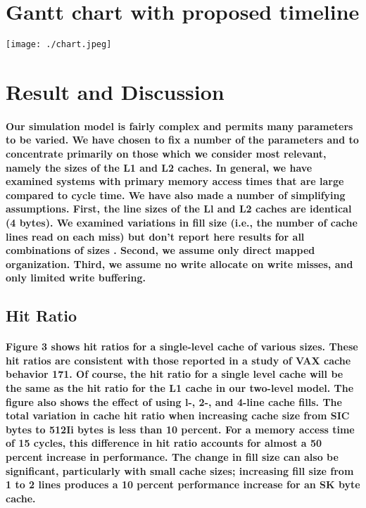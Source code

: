 \documentclass{article}
\begin{document}
\section{Gantt chart with proposed timeline}
\texttt{[image: ./chart.jpeg]}

\section{Result and Discussion}

\paragraph{Our simulation model is fairly complex and permits many 
parameters to be varied. We have chosen to fix a number of the parameters 
and to concentrate primarily on those which we consider most relevant, namely 
the sizes of the L1 and L2 caches. In general, we have examined systems with 
primary memory access times that are large compared to cycle time. We have also
 made a number of simplifying assumptions. First, the line sizes of the Ll and L2 
 caches are identical (4 bytes). We examined variations in fill size (i.e., the number 
 of cache lines read on each miss) but don’t report here results for all
  combinations of sizes . Second, we assume only direct mapped organization.
   Third, we assume no write allocate on write misses, and only limited write buffering. }

\subsection{Hit Ratio}
\paragraph{Figure 3 shows hit ratios for a single-level cache of various sizes. 
These hit ratios are consistent with those reported in a study of VAX cache behavior 
171. Of course, the hit ratio for a single level cache will be the same as the hit ratio 
for the L1 cache in our two-level model. The figure also shows the effect of using l-, 2-, 
and 4-line cache fills. The total variation in cache hit ratio when increasing cache size 
from SIC bytes to 512Ii bytes is less than 10 percent. For a memory access time of 15 cycles,
 this difference in hit ratio accounts for almost a 50 percent increase in performance. 
 The change in fill size can also be significant, particularly with small cache sizes; 
 increasing fill size from 1 to 2 lines produces a 10 percent performance increase for an SK byte cache.}
\end{document}
